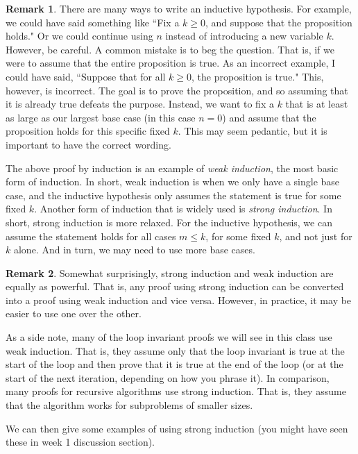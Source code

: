 \documentclass{article}
\theoremstyle{plain}
\theoremstyle{definition}
\newtheorem{remark}{Remark}
\begin{document}
\begin{remark}
    There are many ways to write an inductive hypothesis. For example, we could have said something like ``Fix a \(k \geq 0\), and suppose that the proposition holds." Or we could continue using \(n\) instead of introducing a new variable \(k\). However, be careful. A common mistake is to beg the question. That is, if we were to assume that the entire proposition is true. As an incorrect example, I could have said, ``Suppose that for all \(k \geq 0\), the proposition is true." This, however, is incorrect. The goal is to prove the proposition, and so assuming that it is already true defeats the purpose. Instead, we want to fix a \(k\) that is at least as large as our largest base case (in this case \(n=0\)) and assume that the proposition holds for this specific fixed \(k\). This may seem pedantic, but it is important to have the correct wording.
\end{remark}

\phantom{a}

The above proof by induction is an example of \emph{weak induction}, the most basic form of induction. In short, weak induction is when we only have a single base case, and the inductive hypothesis only assumes the statement is true for some fixed \(k\). Another form of induction that is widely used is \emph{strong induction}. In short, strong induction is more relaxed. For the inductive hypothesis, we can assume the statement holds for all cases \(m \leq k\), for some fixed \(k\), and not just for \(k\) alone. And in turn, we may need to use more base cases.

\begin{remark}
Somewhat surprisingly, strong induction and weak induction are equally as powerful. That is, any proof using strong induction can be converted into a proof using weak induction and vice versa. However, in practice, it may be easier to use one over the other. 
\end{remark}

As a side note, many of the loop invariant proofs we will see in this class use weak induction. That is, they assume only that the loop invariant is true at the start of the loop and then prove that it is true at the end of the loop (or at the start of the next iteration, depending on how you phrase it). In comparison, many proofs for recursive algorithms use strong induction. That is, they assume that the algorithm works for subproblems of smaller sizes.

We can then give some examples of using strong induction (you might have seen these in week 1 discussion section).
\end{document}
